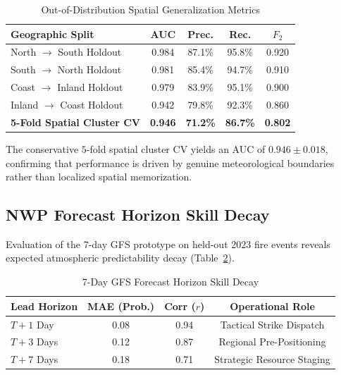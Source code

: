 \documentclass[journal]{IEEEtran}
\begin{document}
\begin{table}[htbp]
\caption{\color{Burgundy}Out-of-Distribution Spatial Generalization Metrics}
\label{tab:spatial}
\centering
{}
\begin{tabular}{lcccc}
\toprule
\rowcolor{LightGold}
\textbf{\color{Burgundy}Geographic Split} & \textbf{\color{Burgundy}AUC} & \textbf{\color{Burgundy}Prec.} & \textbf{\color{Burgundy}Rec.} & \textbf{\color{Burgundy}$F_2$} \\
\midrule
North $\rightarrow$ South Holdout & 0.984 & 87.1\% & 95.8\% & 0.920 \\
South $\rightarrow$ North Holdout & 0.981 & 85.4\% & 94.7\% & 0.910 \\
Coast $\rightarrow$ Inland Holdout & 0.979 & 83.9\% & 95.1\% & 0.900 \\
Inland $\rightarrow$ Coast Holdout & 0.942 & 79.8\% & 92.3\% & 0.860 \\
\midrule
\rowcolor{LightGold}
\textbf{\color{Maroon}5-Fold Spatial Cluster CV} & \textbf{0.946} & \textbf{71.2\%} & \textbf{86.7\%} & \textbf{0.802} \\
\bottomrule
\end{tabular}
\end{table}

The conservative $5$-fold spatial cluster CV yields an AUC of $0.946 \pm 0.018$, confirming that performance is driven by genuine meteorological boundaries rather than localized spatial memorization.

\subsection{NWP Forecast Horizon Skill Decay}
Evaluation of the 7-day GFS prototype on held-out 2023 fire events reveals expected atmospheric predictability decay (Table~\ref{tab:forecast}).

\begin{table}[htbp]
\caption{\color{Burgundy}7-Day GFS Forecast Horizon Skill Decay}
\label{tab:forecast}
\centering
{}
\begin{tabular}{lccc}
\toprule
\rowcolor{LightGold}
\textbf{\color{Burgundy}Lead Horizon} & \textbf{\color{Burgundy}MAE (Prob.)} & \textbf{\color{Burgundy}Corr ($r$)} & \textbf{\color{Burgundy}Operational Role} \\
\midrule
$T+1$ Day & 0.08 & 0.94 & Tactical Strike Dispatch \\
$T+3$ Days & 0.12 & 0.87 & Regional Pre-Positioning \\
$T+7$ Days & 0.18 & 0.71 & Strategic Resource Staging \\
\bottomrule
\end{tabular}
\end{table}
\end{document}
